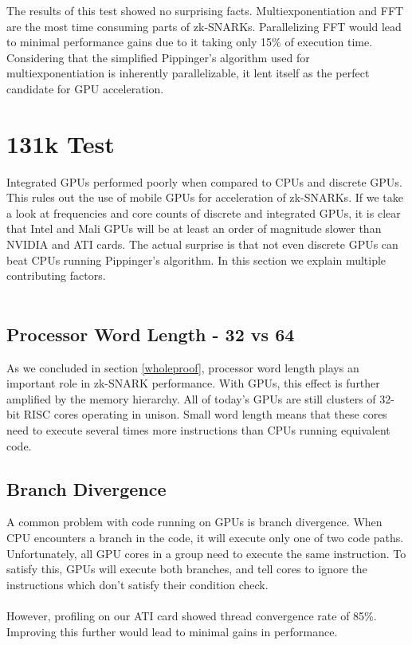 The results of this test showed no surprising facts. Multiexponentiation and FFT are the most time consuming parts of zk-SNARKs. Parallelizing FFT would lead to minimal performance gains due to it taking only 15\% of execution time. Considering that the simplified Pippinger's algorithm used for multiexponentiation is inherently parallelizable, it lent itself as the perfect candidate for GPU acceleration.

\section{131k Test}

Integrated GPUs performed poorly when compared to CPUs and discrete GPUs. This rules out the use of mobile GPUs for acceleration of zk-SNARKs. If we take a look at frequencies and core counts of discrete and integrated GPUs, it is clear that Intel and Mali GPUs will be at least an order of magnitude slower than NVIDIA and ATI cards. The actual surprise is that not even discrete GPUs can beat CPUs running Pippinger's algorithm. In this section we explain multiple contributing factors.\\
\\
\subsection{Processor Word Length - 32 vs 64}

As we concluded in section \ref{wholeproof}, processor word length plays an important role in zk-SNARK performance. With GPUs, this effect is further amplified by the memory hierarchy. All of today's GPUs are still clusters of 32-bit RISC cores operating in unison. Small word length means that these cores need to execute several times more instructions than CPUs running equivalent code.\\

\subsection{Branch Divergence}

A common problem with code running on GPUs is branch divergence. When CPU encounters a branch in the code, it will execute only one of two code paths. Unfortunately, all GPU cores in a group need to execute the same instruction. To satisfy this, GPUs will execute both branches, and tell cores to ignore the instructions which don't satisfy their condition check.\\
\\
However, profiling on our ATI card showed thread convergence rate of 85\%. Improving this further would lead to minimal gains in performance.

